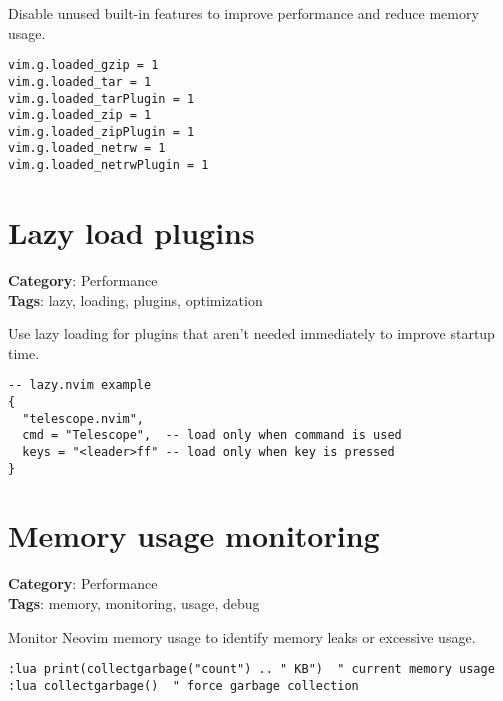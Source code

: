 {{{{{{{{{Disable unused built-in features to improve performance and reduce memory usage.

\begin{Exa*}{}
\begin{Verbatim}[fontsize=\footnotesize, breaklines, breakanywhere]
vim.g.loaded_gzip = 1
vim.g.loaded_tar = 1
vim.g.loaded_tarPlugin = 1
vim.g.loaded_zip = 1
vim.g.loaded_zipPlugin = 1
vim.g.loaded_netrw = 1
vim.g.loaded_netrwPlugin = 1
\end{Verbatim}
\end{Exa*}

\section{Lazy load plugins}

\textbf{Category}: Performance\\ \textbf{Tags}: lazy, loading, plugins, optimization
\vspace{0.5cm}

Use lazy loading for plugins that aren't needed immediately to improve startup time.

\begin{Exa*}{}
\begin{Verbatim}[fontsize=\footnotesize, breaklines, breakanywhere]
-- lazy.nvim example
{
  "telescope.nvim",
  cmd = "Telescope",  -- load only when command is used
  keys = "<leader>ff" -- load only when key is pressed
}
\end{Verbatim}
\end{Exa*}

\section{Memory usage monitoring}

\textbf{Category}: Performance\\ \textbf{Tags}: memory, monitoring, usage, debug
\vspace{0.5cm}

Monitor Neovim memory usage to identify memory leaks or excessive usage.

\begin{Exa*}{}
\begin{Verbatim}[fontsize=\footnotesize, breaklines, breakanywhere]
:lua print(collectgarbage("count") .. " KB")  " current memory usage
:lua collectgarbage()  " force garbage collection
\end{Verbatim}
\end{Exa*}

}}}}}}}}}
